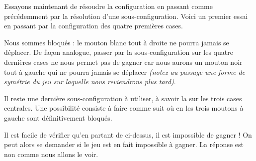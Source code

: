 Essayons maintenant de résoudre la configuration  en passant comme précédemment par la résolution d'une sous-configuration. Voici un premier essai en passant par la configuration  des quatre premières cases.	
\begin{mvts}
	\medskip
	\item  {}

	\medskip
	\item  {}
\end{mvts}

Nous sommes bloqués : le mouton blanc tout à droite ne pourra jamais se déplacer. 
De façon analogue, passer par la sous-configuration  sur les quatre dernières cases ne nous permet pas de gagner car nous aurons un mouton noir tout à gauche qui ne pourra jamais se déplacer \emph{(notez au passage une forme de symétrie du jeu sur laquelle nous reviendrons plus tard)}.


\medskip


Il reste une dernière sous-configuration à utiliser, à savoir la  sur les trois cases centrales. Une possibilité consiste à faire comme suit où en  les trois moutons à gauche sont définitivement bloqués.
\begin{mvts}
	\medskip
	\item  {}

	\medskip
	\item  {}

	\medskip
	\item  {}
\end{mvts}


\medskip


Il est facile de vérifier qu'en partant de  ci-dessus, il est impossible de gagner ! 
On peut alors se demander si le jeu  est en fait impossible à gagner. La réponse est non comme nous allons le voir.


 \label{greedy-2N2B}


